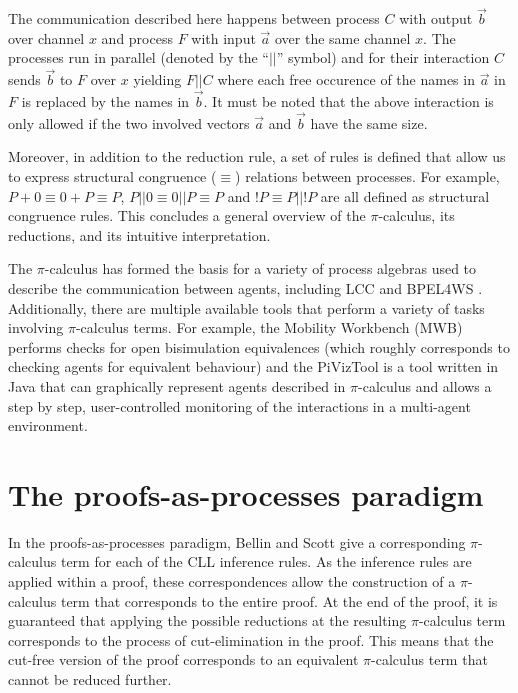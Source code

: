 \documentclass[copyright,creativecommons]{eptcs}
\begin{document}
The communication described here happens between process $C$ with output $\vec{b}$ over channel $x$ and process $F$ with input $\vec{a}$ over the same channel $x$. The processes run in parallel (denoted by the ``$||$'' symbol) and for their interaction $C$ sends $\vec{b}$ to $F$ over $x$ yielding $F||C$ where each free occurence of the names in $\vec{a}$ in $F$ is replaced by the names in $\vec{b}$. It must be noted that the above interaction is only allowed if the two involved vectors $\vec{a}$ and $\vec{b}$ have the same size.

Moreover, in addition to the reduction rule, a set of rules is defined that allow us to express structural congruence ($\equiv$) relations between processes. For example, $P+0\equiv 0+P\equiv P$, $P||0\equiv 0||P\equiv P$ and $!P\equiv P||!P$ are all defined as structural congruence rules. This concludes a general overview of the $\pi$-calculus, its reductions, and its intuitive interpretation.

The $\pi$-calculus has formed the basis for a variety of process algebras used to describe the communication between agents, including LCC \cite{robertson2004lightweight} and BPEL4WS \cite{andrews2003business}. Additionally, there are multiple available tools that perform a variety of tasks involving $\pi$-calculus terms. For example, the Mobility Workbench (MWB) \cite{victor1994mobility} performs checks for open bisimulation equivalences \cite{sangiorgi1996theory} (which roughly corresponds to checking agents for equivalent behaviour) and the PiVizTool \cite{bog2006tool} is a tool written in Java that can graphically represent agents described in $\pi$-calculus and allows a step by step, user-controlled monitoring of the interactions in a multi-agent environment. 


\section{The proofs-as-processes paradigm}
\label{paradigm}

In the proofs-as-processes paradigm, Bellin and Scott \cite{bellin1994} give a corresponding $\pi$-calculus term for each of the CLL inference rules. As the inference rules are applied within a proof, these correspondences allow the construction of a $\pi$-calculus term that corresponds to the entire proof. At the end of the proof, it is guaranteed that applying the possible reductions at the resulting $\pi$-calculus term corresponds to the process of cut-elimination in the proof. This means that the cut-free version of the proof corresponds to an equivalent $\pi$-calculus term that cannot be reduced further.
\end{document}
